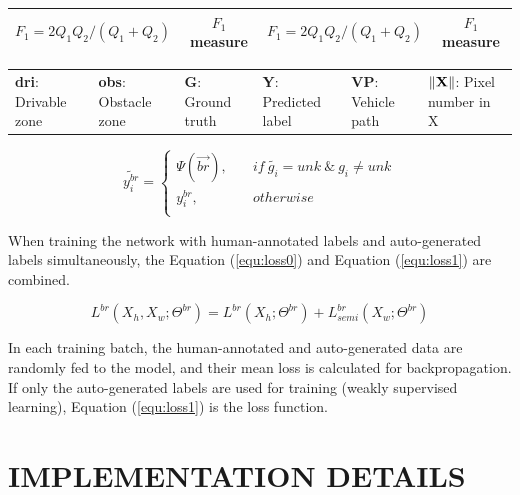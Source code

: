 \documentclass[letterpaper, 10 pt, conference]{ieeeconf}  %
\begin{document}
\begin{table}
\begin{tabular}{cclccl}
		$F_1={2Q_1Q_2}/{(Q_1+Q_2)}$                           & \multicolumn{2}{c|}{$F_1$ measure}                                            & $F_1={2Q_1Q_2}/{(Q_1+Q_2)}$                         & \multicolumn{2}{c}{$F_1$ measure}                                             \\ 
		\hline
	\end{tabular}
	\renewcommand{\arraystretch}{2.3}
	\begin{tabular}{llllll}
		\textbf{dri}: Drivable zone                 & \textbf{obs}: Obstacle zone              & \textbf{G}: Ground truth                            & \textbf{Y}: Predicted label & \textbf{VP}: Vehicle path & $\Arrowvert \textbf{X}\Arrowvert$: Pixel number in X \\
	\end{tabular}
	\vspace{-4mm}
\end{table}

\vspace{-4mm}
\begin{equation}
\widetilde{y_i^{br}}= 
\left\{
\begin{array}{ll}
\Psi(\vec{br}), &\quad if \ \widetilde{g_i} = unk\ \&\ g_i \neq unk \\ 
y_i^{br}, &\quad otherwise \\
\end{array}
\right.
\end{equation}

When training the network with human-annotated labels and auto-generated labels simultaneously, the Equation (\ref{equ:loss0}) and Equation (\ref{equ:loss1}) are combined.

\vspace{-2mm}
\begin{equation}
\label{equ:loss2}
L^{br}(X_h,X_w;\Theta^{br})=L^{br}(X_h;\Theta^{br})+L^{br}_{semi}(X_w;\Theta^{br})
\end{equation}

In each training batch, the human-annotated and auto-generated data are randomly fed to the model, and their mean loss is calculated for backpropagation. If only the auto-generated labels are used for training (weakly supervised learning), Equation (\ref{equ:loss1}) is the loss function.

\section{IMPLEMENTATION DETAILS} \label{sec:implementationdetails}
\end{document}
